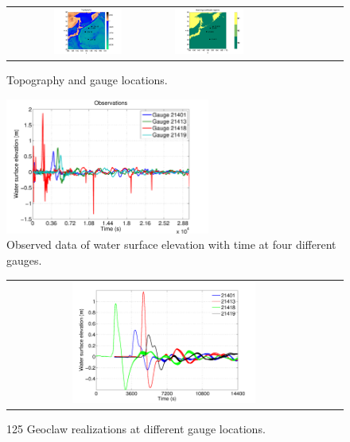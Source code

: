 \begin{figure}[h]
\centering
\begin{tabular}{clc}
\includegraphics[width=0.45\textwidth]{./figures/topo.pdf}  &
\includegraphics[width=0.45\textwidth]{./figures/coef.pdf} 
\label{setup}
\end{tabular}
\caption{Topography and gauge locations.}
\label{fig:setup}
\end{figure}
\begin{figure}[h]      
\centering
\includegraphics[width=0.6\textwidth]{./figures/obs.pdf}
\caption{Observed data of water surface elevation with time at four different gauges.}
\label{fig:obs}
\end{figure}  
\begin{figure}[h]
\centering
\begin{tabular}{clc}        
\includegraphics[width=0.6\textwidth]{./figures/rlzs_gauges.pdf} 
\end{tabular}
\caption{125 Geoclaw realizations at different gauge locations.}
\label{fig:rlzs}
\end{figure}

